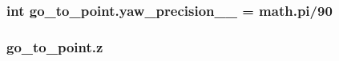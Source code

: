 \subsubsection[{\texorpdfstring{yaw\+\_\+precision\+\_\+2\+\_\+}{yaw_precision_2_}}]{\setlength{\rightskip}{0pt plus 5cm}int go\+\_\+to\+\_\+point.\+yaw\+\_\+precision\+\_\+\_\+ = math.\+pi/90}\hypertarget{namespacego__to__point_af74ccf49164d0478ca8343e2031d5813}{}\label{namespacego__to__point_af74ccf49164d0478ca8343e2031d5813}
\subsubsection[{\texorpdfstring{z}{z}}]{\setlength{\rightskip}{0pt plus 5cm}go\+\_\+to\+\_\+point.\+z}\hypertarget{namespacego__to__point_a2fd68a76b8583598a4bceccdeae5d73b}{}\label{namespacego__to__point_a2fd68a76b8583598a4bceccdeae5d73b}
